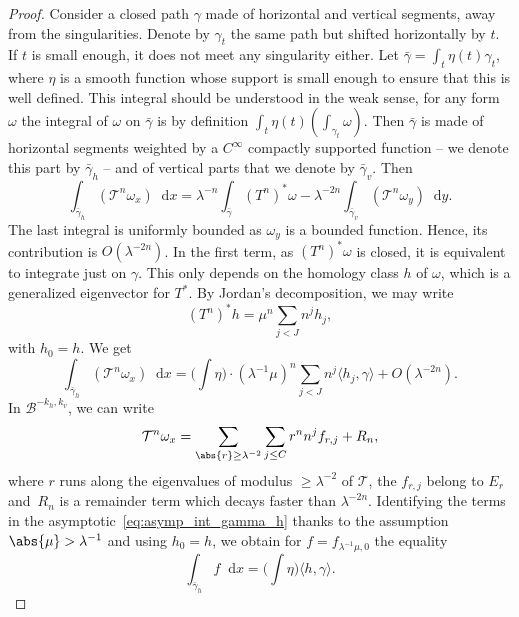 \documentclass[JEP,XML,SOM,Unicode]{cedram}
\newcommand{\boB}{\mathcal{B}}
\newcommand{\boT}{\mathcal{T}}
\newcommand{\dd}{\mathop{}\!\mathrm{d}}
\newcommand{\paregg}[1]{\biggl(#1\biggr)}
\theoremstyle{definition}
\numberwithin{equation}{section}
\begin{document}
\begin{proof}
Consider a closed path $\gamma$ made of horizontal and vertical segments,
away from the singularities. Denote by $\gamma_t$ the same path but shifted
horizontally by $t$. If $t$ is small enough, it does not meet any singularity
either. Let $\bar\gamma = \int_t \eta(t) \gamma_t$, where $\eta$ is a smooth
function whose support is small enough to ensure that this is well defined.
This integral should be understood in the weak sense, \ie for any form
$\omega$ the integral of $\omega$ on $\bar\gamma$ is by definition $\int_t
\eta(t) (\int_{\gamma_t} \omega)$. Then $\bar \gamma$ is made of horizontal
segments weighted by a $C^\infty$ compactly supported function -- we denote
this part by $\bar\gamma_h$ -- and of vertical parts that we denote by $\bar
\gamma_v$. Then
\begin{equation*}
\int_{\bar \gamma_h} (\boT^n \omega_x) \dd x = \lambda^{-n} \int_{\bar\gamma} (T^n)^* \omega -
\lambda^{-2n} \int_{\bar \gamma_v} (\boT^n \omega_y) \dd y.
\end{equation*}
The last integral is uniformly bounded as $\omega_y$ is a bounded function.
Hence, its contribution is $O(\lambda^{-2n})$. In the first term, as $(T^n)^*
\omega$ is closed, it is equivalent to integrate just on $\gamma$. This only
depends on the homology class $h$ of $\omega$, which is a generalized
eigenvector for $T^*$. By Jordan's decomposition, we may write
\begin{equation*}
(T^n)^* h = \mu^n \sum_{j < J} n^j h_j,
\end{equation*}
with $h_0 = h$. We get
\begin{equation}
\label{eq:asymp_int_gamma_h}
\int_{\bar \gamma_h} (\boT^n \omega_x) \dd x = \paregg{\int \eta} \cdot (\lambda^{-1}\mu)^n \sum_{j< J} n^j \langle h_j, \gamma \rangle + O(\lambda^{-2n}).
\end{equation}
In $\boB^{-k_h, k_v}$, we can write
\begin{equation*}
\boT^n \omega_x =
\sum_{\abs{r}\geq \lambda^{-2}} \sum_{j \leq C} r^n n^j f_{r,j}
+ R_n,
\end{equation*}
where $r$ runs along the eigenvalues of modulus $\geq \lambda^{-2}$ of
$\boT$, the $f_{r,j}$ belong to $E_r$ and~$R_n$ is a remainder term which
decays faster than $\lambda^{-2n}$. Identifying the terms in the
asymptotic~\eqref{eq:asymp_int_gamma_h} thanks to the assumption $\abs{\mu} >
\lambda^{-1}$ and using $h_0= h$, we obtain for $f=f_{\lambda^{-1}\mu,0}$ the
equality
\begin{equation}
\label{eq:bargammah}
\int_{\bar\gamma_h} f \dd x = \paregg{\int \eta} \langle h, \gamma \rangle.
\end{equation}


\end{proof}
\end{document}
